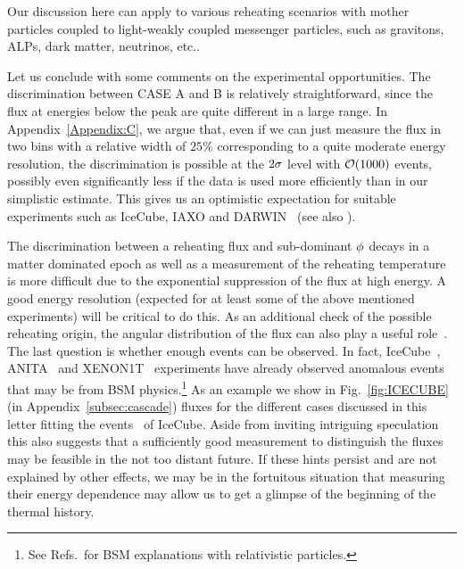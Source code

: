 \documentclass[superscriptaddress,aps,preprintnumbers,amsmath,showpacs,amssymb,prd,nofootinbib,reprint]{revtex4-1}
\begin{document}
{Our discussion here can apply to various reheating scenarios with mother particles coupled to light-weakly coupled messenger particles, such as gravitons, ALPs, dark matter, neutrinos, etc..

Let us conclude with some comments on the experimental opportunities. 
The discrimination between CASE A and B is relatively straightforward, since the flux at energies below the peak are quite different in a large range.
In Appendix~\ref{Appendix:C}, we argue that, even if we can just measure the flux in two bins with a relative width of $25\%$ corresponding to a quite moderate energy resolution, the discrimination is possible at the $2\sigma$ level with $\mathcal{O}(1000)$ events, possibly even significantly less if the data is used more efficiently than in our simplistic estimate.
This gives us an optimistic expectation for suitable experiments such as IceCube, IAXO and DARWIN~\cite{Irastorza:2011gs,Armengaud:2014gea,Armengaud:2019uso,Abeln:2020ywv,2009arXiv0907.2263W,Aartsen:2014gkd,Aartsen:2014njl,Aartsen:2020aqd,Aalbers:2016jon} (see also \cite{Arguelles:2019xgp}).

The discrimination between a reheating flux and sub-dominant $\phi$ decays in a matter dominated epoch as well as a measurement of the reheating temperature is more difficult due to the exponential suppression of the flux at high energy. A good energy resolution (expected for at least some of the above mentioned experiments) will be critical to do this.
As an additional check of the possible reheating origin, the angular distribution of the flux can also play a useful role~\cite{Conlon:2013isa,Ema:2013nda,Ema:2014ufa,Jaeckel:2020oet}.
The last question is whether enough events can be observed. 
In fact, 
IceCube~\cite{Aartsen:2017mau, Aartsen:2018vtx,Abbasi:2020jmh}, ANITA~\cite{Gorham:2016zah, Gorham:2018ydl} and XENON1T~\cite{Aprile:2020tmw}
experiments have already observed anomalous events that may be from BSM physics.\footnote{ See Refs.\,\cite{Feldstein:2013kka,Esmaili:2013gha,Ema:2013nda, Higaki:2014dwa,Rott:2014kfa, Ema:2014ufa,Dudas:2014bca,Murase:2015gea,Dev:2016qbd,Hiroshima:2017hmy,Bhattacharya:2014yha,Kopp:2015bfa,Cui:2017ytb, Cherry:2018rxj, Yin:2018yjn, Fox:2018syq, Heurtier:2019git, Kannike:2020agf,Fornal:2020npv,Su:2020zny,Bloch:2020uzh, Anchordoqui:2021dls} for BSM explanations with relativistic particles.} 
As an example we show in Fig.~\ref{fig:ICECUBE}  (in Appendix~\ref{subsec:cascade}) fluxes for the different cases discussed in this letter fitting the events~\cite{Abbasi:2020jmh} of IceCube. Aside from inviting intriguing speculation this also suggests that a sufficiently good measurement to distinguish the fluxes may be feasible in the not too distant future.
If these hints persist and are not explained by other effects, we may be in the fortuitous situation that measuring their energy dependence may allow us to get a glimpse of the beginning of the thermal history.



}
\end{document}
